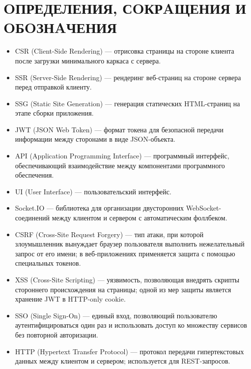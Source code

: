\newpage
{}
\section*{OПРЕДЕЛЕНИЯ, СOКРAЩЕНИЯ И OБOЗНAЧЕНИЯ}
\setcounter{page}{4}

\begin{itemize}
  \item CSR (Client-Side Rendering) — отрисовка страницы на стороне клиента после загрузки минимального каркаса с сервера.
  \item SSR (Server-Side Rendering) — рендеринг веб-страниц на стороне сервера перед отправкой клиенту.
  \item SSG (Static Site Generation) — генерация статических HTML-страниц на этапе сборки приложения.
  \item JWT (JSON Web Token) — формат токена для безопасной передачи информации между сторонами в виде JSON-объекта.
  \item API (Application Programming Interface) — программный интерфейс, обеспечивающий взаимодействие между компонентами программного обеспечения.
  \item UI (User Interface) — пользовательский интерфейс.
  \item Socket.IO — библиотека для организации двусторонних WebSocket-соединений между клиентом и сервером с автоматическим фоллбеком.
  \item CSRF (Cross-Site Request Forgery) — тип атаки, при которой злоумышленник вынуждает браузер пользователя выполнить нежелательный запрос от его имени; в веб-приложениях применяется защита с помощью специальных токенов.
  \item XSS (Cross-Site Scripting) — уязвимость, позволяющая внедрять скрипты стороннего происхождения на страницы; одной из мер защиты является хранение JWT в HTTP-only cookie.
  \item SSO (Single Sign-On) — единый вход, позволяющий пользователю аутентифицироваться один раз и использовать доступ ко множеству сервисов без повторной авторизации.
  \item HTTP (Hypertext Transfer Protocol) — протокол передачи гипертекстовых данных между клиентом и сервером; используется для REST-запросов.

\end{itemize}

